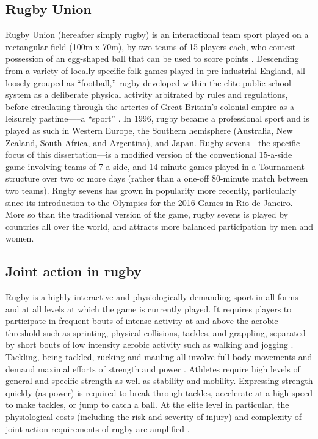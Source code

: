 \begin{CJK}{UTF8}{gbsn}

\section{Rugby Union\label{sect:rugbyUnion}}
Rugby Union (hereafter simply rugby) is an interactional team sport played on a rectangular field (100m x 70m), by two teams of 15 players each, who contest possession of an egg-shaped ball that can be used to score points \citep{IRB2014}.  Descending from a variety of locally-specific folk games played in pre-industrial England, all loosely grouped as ``football,'' rugby developed within the elite public school system as a deliberate physical activity arbitrated by rules and regulations, before circulating through the arteries of Great Britain's colonial empire as a leisurely pastime—--a ``sport'' \citep{Dunning2005}.  In 1996, rugby became a professional sport and is played as such in Western Europe, the Southern hemisphere (Australia, New Zealand, South Africa, and Argentina), and Japan. Rugby sevens---the specific focus of this dissertation---is a modified version of the conventional 15-a-side game involving teams of 7-a-side, and 14-minute games played in a Tournament structure over two or more days (rather than a one-off 80-minute match between two teams).  Rugby sevens has grown in popularity more recently, particularly since its introduction to the Olympics for the 2016 Games in Rio de Janeiro.  More so than the traditional version of the game, rugby sevens is played by countries all over the world, and attracts more balanced participation by men and women.

\subsection{Joint action in rugby \label{sect:jointActionRugby}}
Rugby is a highly interactive and physiologically demanding sport in all forms and at all levels at which the game is currently played.  It requires players to participate in frequent bouts of intense activity at and above the aerobic threshold such as sprinting, physical collisions, tackles, and grappling, separated by short bouts of low intensity aerobic activity such as walking and jogging \cite{Duthie2003}.  Tackling, being tackled, rucking and mauling all involve full-body movements and demand maximal efforts of strength and power \citep{Elloumi2012}.  Athletes require high levels of general and specific strength as well as stability and mobility.  Expressing strength quickly (as power) is required to break through tackles, accelerate at a high speed to make tackles, or jump to catch a ball.  At the elite level in particular, the physiological costs (including the risk and severity of injury) and complexity of joint action requirements of rugby are amplified \citep{Coughlan2011}.


\end{CJK}
